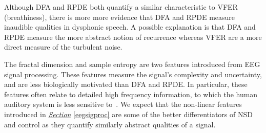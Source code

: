 \documentclass[12pt, twoside]{book}
\begin{document}
Although DFA and RPDE both quantify a similar characteristic to VFER (breathiness), there is more more evidence that DFA and RPDE measure inaudible qualities in dysphonic speech. A possible explanation is that DFA and RPDE measure the more abstract notion of recurrence whereas VFER are a more direct measure of the turbulent noise. 



The fractal dimension and sample entropy are two features introduced from EEG signal processing. These features measure the signal's complexity and uncertainty, and are less biologically motivated than DFA and RPDE. In particular, these features often relate to detailed high frequency information, to which the human auditory system is less sensitive to~\cite{auditoryrange}. We  expect that the non-linear features introduced in \textit{\hyperref[eegsigproc]{Section}} \ref{eegsigproc} are some of the better differentiators of NSD and control as they quantify similarly abstract qualities of a signal.
\end{document}
